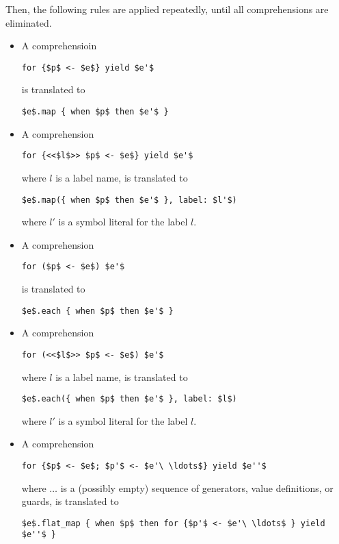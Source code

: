 Then, the following rules are applied repeatedly, until all comprehensions are eliminated. 
\begin{itemize}

\item A comprehensioin 
\begin{lstlisting}
for {$p$ <- $e$} yield $e'$
\end{lstlisting}
is translated to
\begin{lstlisting}
$e$.map { when $p$ then $e'$ }
\end{lstlisting}

\item A comprehension
\begin{lstlisting}
for {<<$l$>> $p$ <- $e$} yield $e'$
\end{lstlisting}
where $l$ is a label name, is translated to
\begin{lstlisting}[deletekeywords={label}]
$e$.map({ when $p$ then $e'$ }, label: $l'$)
\end{lstlisting}
where $l'$ is a symbol literal for the label $l$. 

\item A comprehension 
\begin{lstlisting}
for ($p$ <- $e$) $e'$
\end{lstlisting}
is translated to
\begin{lstlisting}
$e$.each { when $p$ then $e'$ }
\end{lstlisting}

\item A comprehension 
\begin{lstlisting}
for (<<$l$>> $p$ <- $e$) $e'$
\end{lstlisting}
where $l$ is a label name, is translated to
\begin{lstlisting}[deletekeywords={label}]
$e$.each({ when $p$ then $e'$ }, label: $l$)
\end{lstlisting}
where $l'$ is a symbol literal for the label $l$. 

\item A comprehension 
\begin{lstlisting}
for {$p$ <- $e$; $p'$ <- $e'\ \ldots$} yield $e''$
\end{lstlisting}
where $\ldots$ is a (possibly empty) sequence of generators, value definitions, or guards, is translated to
\begin{lstlisting}
$e$.flat_map { when $p$ then for {$p'$ <- $e'\ \ldots$ } yield $e''$ }
\end{lstlisting}


\end{itemize}

